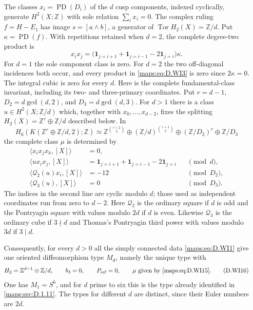 \begin{theorem}
The classes $x_i=\operatorname{PD}(D_i)$ of the $d$ cusp components,
indexed cyclically, generate $H^2(X;\mathbb Z)$ with sole relation
$\sum_i x_i=0$.  The complex ruling $f=H-E_1$ has image
$s=[a\wedge b]$, a generator of $\operatorname{Tor}H_2(X)=\mathbb Z/d$.
Put $\kappa=\operatorname{PD}(f)$.  With repetitions retained when
$d=2$, the complete degree-two product is
\[
 x_i x_j=
 \bigl(\mathbf1_{j=i+1}+\mathbf1_{j=i-1}-2\mathbf1_{j=i}\bigr)\kappa.
 \tag{D.WI3}\label{maps:eq:D.WI3}
\]
For $d=1$ the sole component class is zero.  For $d=2$ the two
off-diagonal incidences both occur, and every product in \eqref{maps:eq:D.WI3}
is zero since $2\kappa=0$.  The integral cubic is zero for every $d$.
Here is the complete fundamental-class invariant, including its
two- and three-primary coordinates. Put
$r=d-1$, $D_2=d\gcd(d,2)$, and $D_3=d\gcd(d,3)$.
For $d>1$ there is a class $u\in H^2(X;\mathbb Z/d)$
which, together with $x_0,\ldots,x_{d-2}$, fixes the splitting
$H_2(X)=\mathbb Z^r\oplus\mathbb Z/d$ described below. In
\[
 H_6(K(\mathbb Z^r\oplus\mathbb Z/d,2);\mathbb Z)
 \simeq
 \mathbb Z^{\binom{r+2}{3}}\oplus
 (\mathbb Z/d)^{\binom{r+1}{2}}\oplus
 (\mathbb Z/D_2)^r\oplus\mathbb Z/D_3
 \tag{D.WI14}\label{maps:eq:D.WI14}
\]
the complete class $\mu$ is determined by
\[
 \begin{aligned}
 \langle x_i x_j x_k,[X]\rangle&=0,\\
 \langle u x_i x_j,[X]\rangle
    &=\mathbf1_{j=i+1}+\mathbf1_{j=i-1}-2\mathbf1_{j=i}
                                                     &&\pmod d,\\
 \langle \mathcal Q_2(u)x_i,[X]\rangle&=-12             &&\pmod {D_2},\\
 \langle \mathcal Q_3(u),[X]\rangle&=0                 &&\pmod {D_3}.
 \end{aligned}
 \tag{D.WI15}\label{maps:eq:D.WI15}
\]
The indices in the second line are cyclic modulo $d$; those
used as independent coordinates run from zero to $d-2$.
Here $\mathcal Q_2$ is the ordinary square if $d$ is odd and
the Pontryagin square with values modulo $2d$ if $d$ is even.
Likewise $\mathcal Q_3$ is the ordinary cube if $3\nmid d$
and Thomas's Pontryagin third power with values modulo $3d$
if $3\mid d$.

Consequently, for every $d>0$ all the simply connected data
\eqref{maps:eq:D.WI1} give one oriented diffeomorphism type $M_d$, namely
the unique type with
\[
 H_2=\mathbb Z^{d-1}\oplus\mathbb Z/d,\qquad b_3=0,\qquad
 P_{\rm ref}=0,\qquad \mu\ \text{given by \eqref{maps:eq:D.WI15}}.
 \tag{D.WI16}\label{maps:eq:D.WI16}
\]
One has $M_1=S^6$, and for $d$ prime to six this is the
type already identified in \ref{maps:src:D.1.11}. The types for different
$d$ are distinct, since their Euler numbers are $2d$.

\end{theorem}


